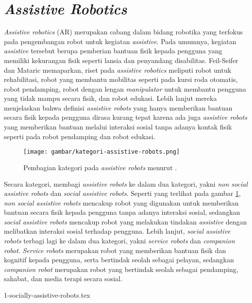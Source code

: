 \section{\emph{Assistive Robotics}}
\label{sec:sociallyassistiverobots}

\emph{Assistive robotics} (AR) merupakan cabang dalam bidang robotika yang terfokus pada pengembangan robot untuk kegiatan \emph{assistive}.
Pada umumnya, kegiatan \emph{assistive} tersebut berupa pemberian bantuan fisik kepada pengguna yang memiliki kekurangan fisik seperti lansia dan penyandang disabilitas.
Feil-Seifer dan Mataric \citep{cit:seifer2005} memaparkan,
  riset pada \emph{assistive robotics} meliputi robot untuk rehabilitasi,
  robot yang membantu mobilitas seperti pada kursi roda otomatis,
  robot pendamping,
  robot dengan lengan \emph{manipulator} untuk membantu pengguna yang tidak mampu secara fisik,
  dan robot edukasi.
Lebih lanjut mereka menjelaskan bahwa definisi \emph{assistive robots} yang hanya memberikan bantuan secara fisik kepada pengguna dirasa kurang tepat karena ada juga \emph{assistive robots} yang memberikan bantuan melalui interaksi sosial tanpa adanya kontak fisik seperti pada robot pendamping dan robot edukasi.

\begin{figure}[ht]
  \centering
  \texttt{[image: gambar/kategori-assistive-robots.png]}
  \caption{Pembagian kategori pada \emph{assistive robots} menurut \citet{cit:heerink2010}.}
  \label{fig:kategoriassistiverobots}
\end{figure}

Secara kategori, \citet{cit:heerink2010} membagi \emph{assistive robots} ke dalam dua kategori,
  yakni \emph{non social assistive robots} dan \emph{social assistive robots}.
Seperti yang terlihat pada gambar \ref{fig:kategoriassistiverobots},
\emph{non social assistive robots} mencakup robot yang digunakan untuk memberikan bantuan secara fisik kepada pengguna tanpa adanya interaksi sosial,
  sedangkan \emph{social assistive robots} mencakup robot yang melakukan tindakan \emph{assistive} dengan melibatkan interaksi sosial terhadap pengguna.
Lebih lanjut, \emph{social assistive robots} terbagi lagi ke dalam dua kategori,
  yakni \emph{service robots} dan \emph{companion robot}.
\emph{Service robots} merupakan robot yang memberikan bantuan fisik dan kognitif kepada pengguna,
  serta bertindak seolah sebagai pelayan,
  sedangkan \emph{companion robot} merupakan robot yang bertindak seolah sebagai pendamping,
  sahabat, dan media terapi secara sosial.

{1-socially-assistive-robots.tex}
